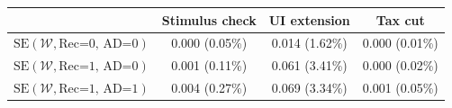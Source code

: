 \begin{tabular}{@{}lccc@{}}
\toprule
                          & Stimulus check      & UI extension    & Tax cut    \\  \midrule
$\mathrm{SE}(\mathcal{W}, \text{Rec=0, AD=0})$ & 0.000 (0.05\%)  & 0.014 (1.62\%)  & 0.000 (0.01\%)     \\
$\mathrm{SE}(\mathcal{W}, \text{Rec=1, AD=0})$ & 0.001 (0.11\%)  & 0.061 (3.41\%)  & 0.000 (0.02\%)     \\
$\mathrm{SE}(\mathcal{W}, \text{Rec=1, AD=1})$ & 0.004 (0.27\%)  & 0.069 (3.34\%)  & 0.001 (0.05\%)     \\ \bottomrule
\end{tabular}
